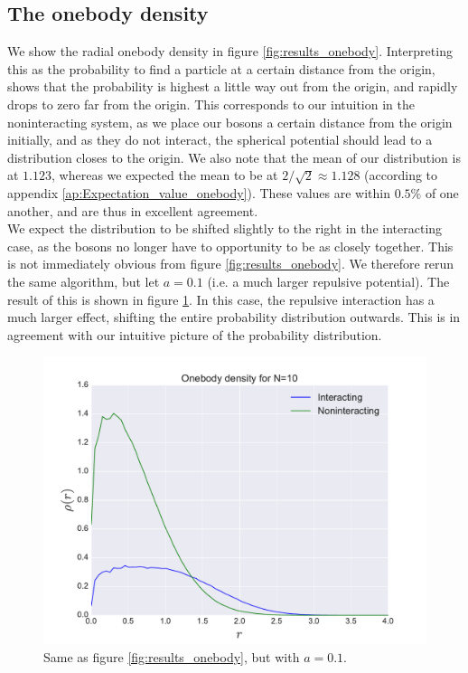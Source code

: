 \documentclass[a4paper, 10pt]{article}
\begin{document}
	 \subsection{The onebody density}\label{sec:Disc_onebody}
	 We show the radial onebody density in figure \ref{fig:results_onebody}. Interpreting this as the probability to find a particle at a certain distance from the origin, shows that the probability is highest a little way out from the origin, and rapidly drops to zero far from the origin. This corresponds to our intuition in the noninteracting system, as we place our bosons a certain distance from the origin initially, and as they do not interact, the spherical potential should lead to a distribution closes to the origin. We also note that the mean of our distribution is at $1.123$, whereas we expected the mean to be at $2/\sqrt{2}\approx 1.128$ (according to appendix \ref{ap:Expectation_value_onebody}). These values are within $0.5\%$ of one another, and are thus in excellent agreement.\\
	 \linebreak
	  We expect the distribution to be shifted slightly to the right in the interacting case, as the bosons no longer have to opportunity to be as closely together. This is not immediately obvious from figure \ref{fig:results_onebody}. We therefore rerun the same algorithm, but let $a=0.1$ (i.e. a much larger repulsive potential). The result of this is shown in figure \ref{fig:disc_onebody}. In this case, the repulsive interaction has a much larger effect, shifting the entire probability distribution outwards. This is in agreement with our intuitive picture of the probability distribution.
	 \begin{figure}[ht!]
	 	\centering
	 	\includegraphics[scale=0.8]{../Results/onbodyHighAlpha.pdf}
	 	\caption{Same as figure \ref{fig:results_onebody}, but with $a=0.1$.}\label{fig:disc_onebody}
	 \end{figure}
	 \pagebreak
\end{document}
